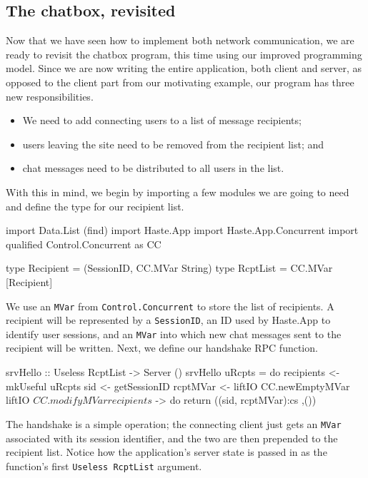 \documentclass[preprint]{sigplanconf}
\begin{document}
\subsection{The chatbox, revisited}

Now that we have seen how to implement both network communication, we are ready
to revisit the chatbox program, this time using our improved programming model.
Since we are now writing the entire application, both client and server, as
opposed to the client part from our motivating example, our program has three
new responsibilities.

\begin{itemize}
  \item We need to add connecting users to a list of message recipients;
  \item users leaving the site need to be removed from the recipient list; and
  \item chat messages need to be distributed to all users in the list.
\end{itemize}

With this in mind, we begin by importing a few modules we are going to need and
define the type for our recipient list.

\begin{code}
import Data.List (find)
import Haste.App
import Haste.App.Concurrent
import qualified Control.Concurrent as CC

type Recipient = (SessionID, CC.MVar String)
type RcptList = CC.MVar [Recipient]
\end{code}

We use an \lstinline!MVar! from \lstinline!Control.Concurrent! to store the
list of recipients. A recipient will be represented by a \lstinline!SessionID!,
an ID used by Haste.App to identify user sessions, and an \lstinline!MVar! into
which new chat messages sent to the recipient will be written. Next, we define
our handshake RPC function.

\begin{code}
srvHello :: Useless RcptList -> Server ()
srvHello uRcpts = do
  recipients <- mkUseful uRcpts
  sid <- getSessionID
  rcptMVar <- liftIO CC.newEmptyMVar
  liftIO $ CC.modifyMVar recipients $ \cs -> do
    return ((sid, rcptMVar):cs ,())
\end{code}

The handshake is a simple operation; the connecting client just gets an
\lstinline!MVar! associated with its session identifier, and the two are then
prepended to the recipient list. Notice how the application's server state is
passed in as the function's first \lstinline!Useless RcptList! argument.
\end{document}
